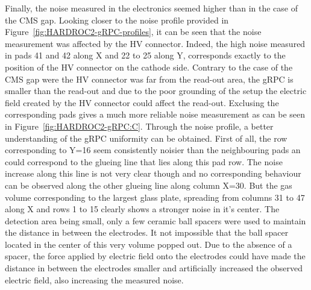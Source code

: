 	Finally, the noise measured in the electronics seemed higher than in the case of the CMS gap. Looking closer to the noise profile provided in Figure~\ref{fig:HARDROC2-gRPC-profiles}, it can be seen that the noise measurement was affected by the HV connector. Indeed, the high noise measured in pads 41 and 42 along X and 22 to 25 along Y, corresponds exactly to the position of the HV connector on the cathode side. Contrary to the case of the CMS gap were the HV connector was far from the read-out area, the gRPC is smaller than the read-out and due to the poor grounding of the setup the electric field created by the HV connector could affect the read-out. Exclusing the corresponding pads gives a much more reliable noise measurement as can be seen in Figure~\ref{fig:HARDROC2-gRPC:C}. Through the noise profile, a better understanding of the gRPC uniformity can be obtained. First of all, the row corresponding to Y=16 seem consistently noisier than the neighbouring pads an could correspond to the glueing line that lies along this pad row. The noise increase along this line is not very clear though and no corresponding behaviour can be observed along the other glueing line along column X=30. But the gas volume corresponding to the largest glass plate, spreading from columns 31 to 47 along X and rows 1 to 15 clearly shows a stronger noise in it's center. The detection area being small, only a few ceramic ball spacers were used to maintain the distance in between the electrodes. It not impossible that the ball spacer located in the center of this very volume popped out. Due to the absence of a spacer, the force applied by electric field onto the electrodes could have made the distance in between the electrodes smaller and artificially increased the observed electric field, also increasing the measured noise.
	 
